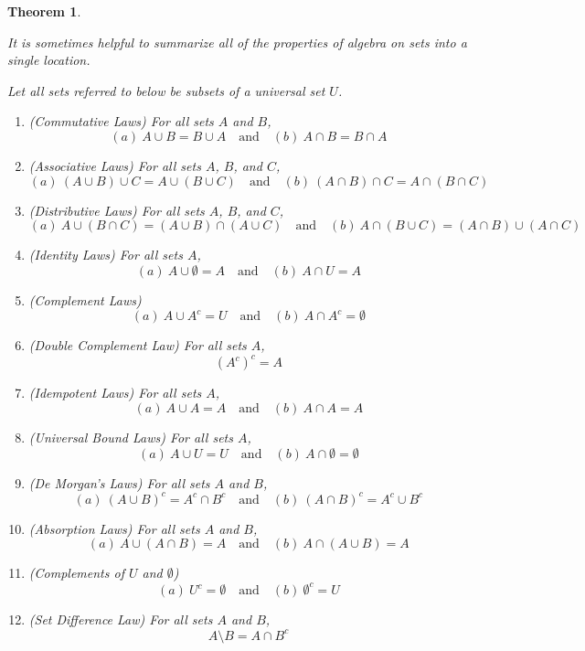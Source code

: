 \documentclass[
]{book}
\newtheorem{theorem}{Theorem}[chapter]
\theoremstyle{definition}
\theoremstyle{definition}
\theoremstyle{definition}
\theoremstyle{definition}
\theoremstyle{remark}
\begin{document}
\begin{theorem}
\protect\hypertarget{thm:set-identities}{}\label{thm:set-identities}

It is sometimes helpful to summarize all of the properties of algebra on sets into a single location.

Let all sets referred to below be subsets of a universal set \(U\).

\begin{enumerate}
\def\labelenumi{\arabic{enumi}.}
\item
  (Commutative Laws) For all sets \(A\) and \(B\),
  \[(a) \: A \cup B = B \cup A \quad \mbox{and} \quad (b) \: A \cap B = B \cap A\]
\item
  (Associative Laws) For all sets \(A\), \(B\), and \(C\),
  \[(a) \: (A\cup B)\cup C = A \cup (B \cup C) \quad \mbox{and} \quad (b) \: (A \cap B) \cap C = A \cap (B\cap C)\]
\item
  (Distributive Laws) For all sets \(A\), \(B\), and \(C\),
  \[(a) \: A \cup (B \cap C) = (A \cup B)\cap (A \cup C) \quad \mbox{and} \quad (b) \: A \cap (B \cup C) = (A \cap B)\cup (A \cap C)\]
\item
  (Identity Laws) For all sets \(A\),
  \[(a) \: A \cup \emptyset = A \quad \mbox{and} \quad (b) \: A \cap U = A\]
\item
  (Complement Laws)
  \[(a) \: A \cup A^c = U \quad \mbox{and} \quad (b) \: A \cap A^c = \emptyset\]
\item
  (Double Complement Law) For all sets \(A\),
  \[(A^c)^c =A\]
\item
  (Idempotent Laws) For all sets \(A\),
  \[(a) \: A\cup A=A \quad \mbox{and} \quad (b) \: A \cap A =A\]
\item
  (Universal Bound Laws) For all sets \(A\),
  \[(a) \: A \cup U = U\quad \mbox{and} \quad (b) \: A \cap \emptyset = \emptyset\]
\item
  (De Morgan's Laws) For all sets \(A\) and \(B\),
  \[(a) \: (A \cup B)^c = A^c \cap B^c\quad \mbox{and} \quad (b) \: (A \cap B)^c = A^c \cup B^c\]
\item
  (Absorption Laws) For all sets \(A\) and \(B\),
  \[(a) \: A \cup (A \cap B) = A \quad \mbox{and} \quad (b) \: A \cap (A \cup B ) = A\]
\item
  (Complements of \(U\) and \(\emptyset\))
  \[(a) \: U^c = \emptyset \quad \mbox{and} \quad (b) \: \emptyset^c = U\]
\item
  (Set Difference Law) For all sets \(A\) and \(B\),
  \[A\setminus B = A \cap B^c\]
\end{enumerate}

\end{theorem}
\end{document}
